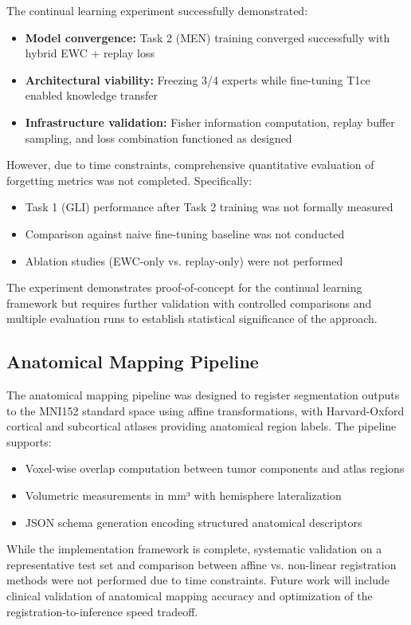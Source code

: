 \documentclass[conference]{IEEEtran}
\begin{document}
The continual learning experiment successfully demonstrated:
\begin{itemize}
\item \textbf{Model convergence:} Task 2 (MEN) training converged successfully with hybrid EWC + replay loss
\item \textbf{Architectural viability:} Freezing 3/4 experts while fine-tuning T1ce enabled knowledge transfer
\item \textbf{Infrastructure validation:} Fisher information computation, replay buffer sampling, and loss combination functioned as designed
\end{itemize}

However, due to time constraints, comprehensive quantitative evaluation of forgetting metrics was not completed. Specifically:
\begin{itemize}
\item Task 1 (GLI) performance after Task 2 training was not formally measured
\item Comparison against naive fine-tuning baseline was not conducted
\item Ablation studies (EWC-only vs. replay-only) were not performed
\end{itemize}

The experiment demonstrates proof-of-concept for the continual learning framework but requires further validation with controlled comparisons and multiple evaluation runs to establish statistical significance of the approach.

\subsection{Anatomical Mapping Pipeline}

The anatomical mapping pipeline was designed to register segmentation outputs to the MNI152 standard space using affine transformations, with Harvard-Oxford cortical and subcortical atlases providing anatomical region labels. The pipeline supports:
\begin{itemize}
\item Voxel-wise overlap computation between tumor components and atlas regions
\item Volumetric measurements in mm³ with hemisphere lateralization
\item JSON schema generation encoding structured anatomical descriptors
\end{itemize}

While the implementation framework is complete, systematic validation on a representative test set and comparison between affine vs. non-linear registration methods were not performed due to time constraints. Future work will include clinical validation of anatomical mapping accuracy and optimization of the registration-to-inference speed tradeoff.
\end{document}
